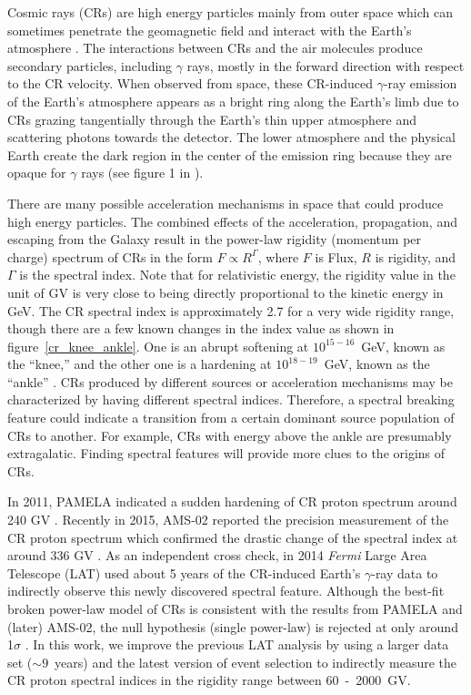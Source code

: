 Cosmic rays (CRs) are high energy particles mainly from outer space which can sometimes
penetrate the geomagnetic field and interact with the Earth's atmosphere \cite{HESS,Pacini,Clay}.
The interactions between CRs and the air molecules produce secondary particles,
including $\gamma$ rays, mostly in the forward direction with respect to the CR velocity.
When observed from space, these CR-induced $\gamma$-ray emission of the Earth's
atmosphere appears as a bright ring along the Earth's limb due to CRs grazing
tangentially through the Earth's thin upper atmosphere and scattering photons
towards the detector. The lower atmosphere and the physical Earth create the dark
region in the center of the emission ring because they are opaque
for $\gamma$ rays (see figure 1 in \cite{Warit2009}).

There are many possible acceleration mechanisms in
space that could produce high energy particles.
The combined effects of the acceleration, propagation, and escaping from the Galaxy
result in the power-law rigidity (momentum per charge) spectrum of CRs in the
form $F\propto R^\Gamma$, where $F$ is Flux, $R$ is rigidity, and $\Gamma$ is
the spectral index. Note that for relativistic energy, the rigidity value in
the unit of GV is very close to being directly proportional to the kinetic energy
in GeV. The CR spectral index is approximately 2.7 for a very wide rigidity range,
though there are a few known changes in the index value as shown in figure~\ref{cr_knee_ankle}.
One is an abrupt softening
at $10^{15-16}$~GeV, known as the ``knee,'' \cite{Allan1962,Haungs2003} and the other one is a
hardening at $10^{18-19}$~GeV, known as the ``ankle'' \cite{ABBASI2005271}.
CRs produced by different sources or acceleration mechanisms may be characterized
by having different spectral indices. Therefore, a spectral breaking feature
could indicate a transition from a certain dominant source population of
CRs to another. For example, CRs with energy above the ankle are presumably
extragalatic. Finding spectral features will provide more clues to the origins
of CRs.


In 2011, PAMELA indicated a sudden hardening of CR proton spectrum around 240 GV \cite{PAMELA}.
Recently in 2015, AMS-02 reported the precision measurement of the CR proton spectrum
which confirmed the drastic change of the spectral index at around 336 GV \cite{AMS-02}.
As an independent cross check, in 2014 {\it Fermi} Large Area Telescope (LAT) used
about 5 years of the CR-induced Earth's $\gamma$-ray data to indirectly observe
this newly discovered spectral feature. Although the best-fit broken power-law
model of CRs is consistent with the results from PAMELA and (later) AMS-02, the null
hypothesis (single power-law) is rejected at only around 1$\sigma$ \cite{previouswork}.
In this work, we improve the previous LAT analysis by using a larger data set
($\sim9$~years) and the latest version of event selection to indirectly measure the
CR proton spectral indices in the rigidity range between 60~-~2000~GV.